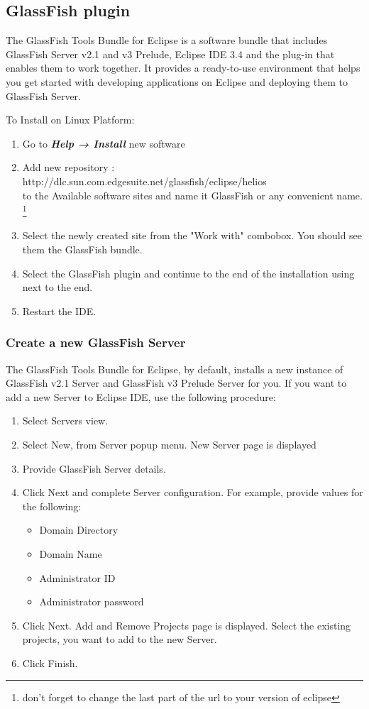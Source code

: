 \subsection{GlassFish plugin}
The GlassFish Tools Bundle for Eclipse is a software bundle that includes GlassFish Server v2.1
and v3 Prelude, Eclipse IDE 3.4 and the plug-in that enables them to work together. It provides
a ready-to-use environment that helps you get started with developing applications on Eclipse
and deploying them to GlassFish Server.

To Install on Linux Platform:
\begin{enumerate}
\item Go to \textbf{\textit{Help → Install}} new software
\item Add new repository :\\
{\Link http://dlc.sun.com.edgesuite.net/glassfish/eclipse/helios }\\
to the Available software sites and name it GlassFish or any convenient name. \footnote{don't forget to change the last part of the url to your version of eclipse}
\item Select the newly created site from the "Work with" combobox. You should see them the GlassFish bundle.
\item Select the GlassFish plugin and continue to the end of the installation using next to the end.
\item Restart the IDE.
\end{enumerate}

\subsubsection{Create a new GlassFish Server}
The GlassFish Tools Bundle for Eclipse, by default, installs a new instance of GlassFish v2.1
Server and GlassFish v3 Prelude Server for you. If you want to add a new Server to Eclipse IDE, use the following procedure:

\begin{enumerate}
\item Select Servers view.
\item Select New, from Server popup menu. New Server page is displayed
\item Provide GlassFish Server details.
\item Click Next and complete Server configuration. For example, provide values for the following:
\begin{itemize}
\item Domain Directory
\item Domain Name
\item Administrator ID
\item Administrator password
\end{itemize}
\item Click Next. Add and Remove Projects page is displayed.
Select the existing projects, you want to add to the new Server.
\item Click Finish.
\end{enumerate}

